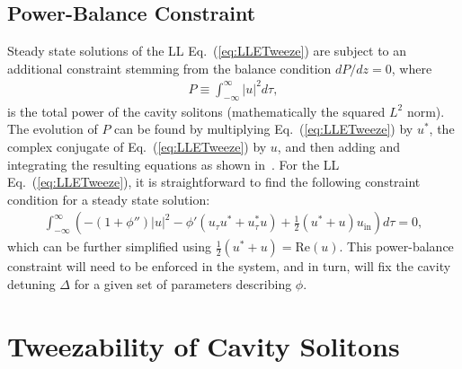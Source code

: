 \subsection{Power-Balance Constraint}

Steady state solutions of the LL Eq.~(\ref{eq:LLETweeze}) are subject to an additional constraint stemming from the balance condition $dP/dz= 0$, where 
\begin{align}
P \equiv \int_{-\infty}^{\infty} |u|^2 d \tau,
\end{align}
is the total power of the cavity solitons (mathematically the squared $L^2$ norm).  The evolution of $P$ can be found by multiplying Eq.~(\ref{eq:LLETweeze}) by $u^*$, the complex conjugate of Eq.~(\ref{eq:LLETweeze}) by $u$, and then adding and integrating the resulting equations as shown in~\cite{Theocharis2006}.  For the LL Eq.~(\ref{eq:LLETweeze}), it is straightforward to find the following constraint condition for a steady state solution:
\begin{align}
\int_{-\infty}^{\infty} \left( - (1 + \phi'') |u|^2 - \phi' \left(u_{\tau} u^* + u_{\tau}^* u \right) + \frac{1}{2} (u^* + u ) u_{\mathrm{in}} \right) d \tau = 0,
\label{LLConstraint}
\end{align} 
which can be further simplified using $\frac{1}{2} (u^* + u ) = \mathrm{Re} (u)$.  This power-balance constraint will need to be enforced in the system, and in turn, will fix the cavity detuning $\Delta$ for a given set of parameters describing $\phi$. 


\section[Tweezabiltiy of Cavity Solitons]{Tweezability of Cavity Solitons} \label{section:TweezePDE}


